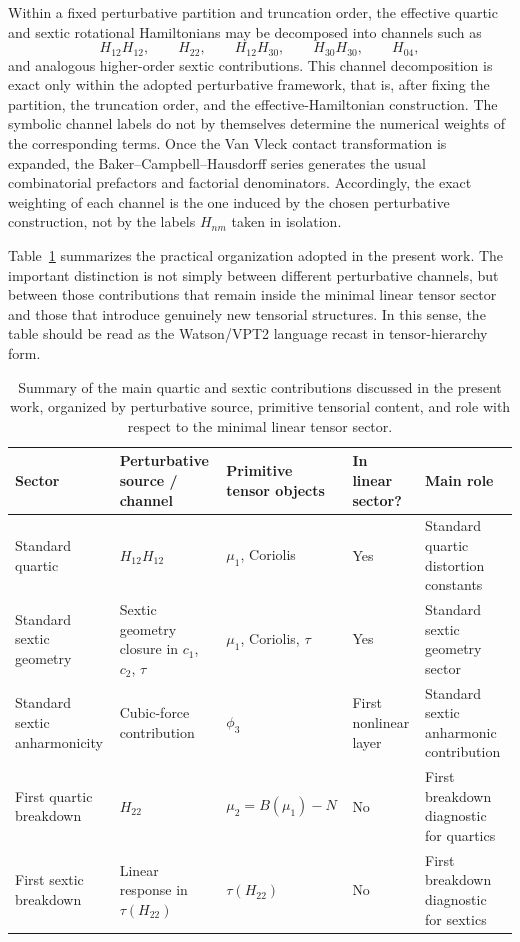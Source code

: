 \documentclass[journal=jacsat,manuscript=article]{achemso}
\begin{document}
Within a fixed perturbative partition and truncation order, the
effective quartic and sextic rotational Hamiltonians may be decomposed
into channels such as
\begin{equation}
H_{12}H_{12},\qquad H_{22},\qquad H_{12}H_{30},\qquad
H_{30}H_{30},\qquad H_{04},
\end{equation}
and analogous higher-order sextic contributions. This channel
decomposition is exact only within the adopted perturbative framework,
that is, after fixing the partition, the truncation order, and the
effective-Hamiltonian construction. The symbolic channel labels do not
by themselves determine the numerical weights of the corresponding
terms. Once the Van Vleck contact transformation is expanded, the
Baker--Campbell--Hausdorff series generates the usual combinatorial
prefactors and factorial denominators. Accordingly, the exact
weighting of each channel is the one induced by the chosen
perturbative construction, not by the labels $H_{nm}$ taken in
isolation.

Table~\ref{tab:channel_hierarchy_summary} summarizes the practical
organization adopted in the present work. The important distinction is
not simply between different perturbative channels, but between those
contributions that remain inside the minimal linear tensor sector and
those that introduce genuinely new tensorial structures. In this
sense, the table should be read as the Watson/VPT2 language recast in
tensor-hierarchy form.\cite{Watson1968,Watson1977,Mills1972}

\begin{table}[t]
\centering
\caption{Summary of the main quartic and sextic contributions discussed in the
present work, organized by perturbative source, primitive tensorial content,
and role with respect to the minimal linear tensor sector.}
\begin{tabular}{lllll}
\toprule
Sector & Perturbative source / channel & Primitive tensor objects & In linear sector? & Main role \\
\midrule
Standard quartic & $H_{12}H_{12}$ & $\mu_1$, Coriolis & Yes & Standard quartic distortion constants \\
Standard sextic geometry & Sextic geometry closure in $c_1$, $c_2$, $\tau$ & $\mu_1$, Coriolis, $\tau$ & Yes & Standard sextic geometry sector \\
Standard sextic anharmonicity & Cubic-force contribution & $\phi_3$ & First nonlinear layer & Standard sextic anharmonic contribution \\
First quartic breakdown & $H_{22}$ & $\mu_2 = B(\mu_1)-N$ & No & First breakdown diagnostic for quartics \\
First sextic breakdown & Linear response in $\tau(H_{22})$ & $\tau(H_{22})$ & No & First breakdown diagnostic for sextics \\
\bottomrule
\end{tabular}
\label{tab:channel_hierarchy_summary}
\end{table}
\end{document}
